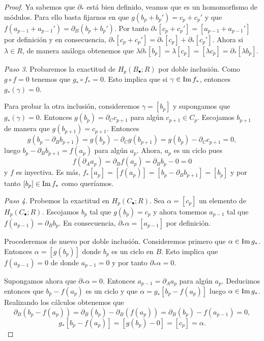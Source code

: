 \begin{proof}
	Ya sabemos que \(\partial_{*}\) está bien definido, veamos que es un homomorfismo
	de módulos. Para ello basta fijarnos en que \(g(b_{p}+ b_{p}') = c_{p}+ c_{p}'\)
	y que \(f(a_{p-1}+ a_{p-1}') = \partial_{B}(b_{p}+ b_{p}')\). Por tanto \(\partial
	_{*}[ c_{p}+ c_{p}'] = [a_{p-1}+ a_{p-1}']\) por definición y en consecuencia,
	\(\partial_{*}[c_{p}+ c_{p}'] = \partial_{*}[c_{p}] + \partial_{*}[c_{p}']\). Ahora
	si \(\lambda \in R\), de manera análoga obtenemos que
	\(\lambda \partial_{*}[b_{p}] = \lambda [c_{p}] = [ \lambda c_{p}] = \partial_{*}
	[ \lambda b_{p}]\).
	
	\textit{Paso 3}. Probaremos la exactitud de \(H_{p}(B_{\bullet};R)\) por doble
	inclusión. Como \(g \circ f = 0\) tenemos que \(g_{*}\circ f_{*}= 0\). Esto
	implica que si \(\gamma \in \operatorname{Im} f_{*}\), entonces \(g_{*}(\gamma) = 0\).
	
	Para probar la otra inclusión, consideremos \(\gamma = [b_{p}]\) y supongamos
	que \(g_{*}(\gamma) = 0\). Entonces \(g(b_{p}) = \partial_{C}c_{p+1}\) para algún \(c
	_{p+1}\in C_{p}\). Escojamos \(b_{p+1}\) de manera que \(g(b_{p+1}) = c_{p+1}\). Entonces
	\[
	g(b_{p}- \partial_{B}b_{p+1}) = g(b_{p}) - \partial_{C}g(b_{p+1}) = g(b_{p})
	- \partial_{C}c_{p+1}= 0,
	\]
	luego \(b_{p}- \partial_{B}b_{p+1}= f(a_{p})\) para algún \(a_{p}\). Ahora, \(a_{p}\)
	es un ciclo pues
	\[
	f(\partial_{A}a_{p}) = \partial_{B}f(a_{p}) = \partial_{B}b_{p}- 0 = 0
	\]
	y \(f\) es inyectiva. Es más, \(f_{*}[a_{p}] = [f(a_{p})] = [b_{p}- \partial_{B}b_{p+1}
	] = [b_{p}]\) y por tanto \([b_{p}] \in \operatorname{Im} f_{*}\) como queríamos.
	
	\textit{Paso 4}. Probemos la exactitud en \(H_{p}(C_{\bullet};R)\). Sea
	\(\alpha = [c_{p}]\) un elemento de \(H_{p}(C_{\bullet};R)\). Escojamos \(b_{p}\) tal
	que \(g(b_{p}) = c_{p}\) y ahora tomemos \(a_{p-1}\) tal que \(f(a_{p-1}) = \partial
	_{B}b_{p}\). En consecuencia, \(\partial_{*}\alpha = [a_{p-1}]\) por definición.
	
	Procederemos de nuevo por doble inclusión. Consideremos primero que
	\(\alpha \in \operatorname{Im} g_{*}\). Entonces \(\alpha = [g(b_{p})]\) donde \(b_{p}\) es un ciclo
	en \(B\). Esto implica que \(f(a_{p-1}) = 0\) de donde \(a_{p-1}= 0\) y por tanto
	\(\partial_{*}\alpha = 0\).
	
	Supongamos ahora que \(\partial_{*}\alpha = 0\). Entonces \(a_{p-1}= \partial_{A}a
	_{p}\) para algún \(a_{p}\). Deducimos entonces que \(b_{p}- f(a_{p})\) es un ciclo
	y que \(\alpha = g_{*}[b_{p}- f(a_{p})]\) luego \(\alpha \in \operatorname{Im} g_{*}\). Realizando
	los cálculos obtenemos que
	\[
	\partial_{B}(b_{p}- f(a_{p})) = \partial_{B}(b_{p}) - \partial_{B}(f(a_{p}))
	= \partial_{B}(b_{p}) - f(a_{p-1}) = 0,
	\]
	\[
	g_{*}[b_{p}- f(a_{p})] = [g(b_{p}) - 0] = [c_{p}] = \alpha.
	\]
	

\end{proof}
